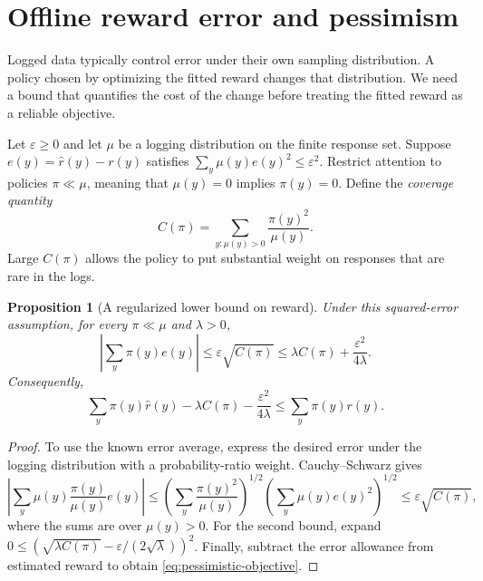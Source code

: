 \documentclass[11pt,twoside]{article}
\newtheorem{proposition}[theorem]{Proposition}
\theoremstyle{definition}
\theoremstyle{remark}
\begin{document}
\section{Offline reward error and pessimism}
\label{app:pessimism}

Logged data typically control error under their own sampling distribution.
A policy chosen by optimizing the fitted reward changes that distribution.
We need a bound that quantifies the cost of the change before treating the
fitted reward as a reliable objective.

Let $\varepsilon\ge0$ and let $\mu$ be a logging distribution on the finite
response set. Suppose
$e(y)=\widehat r(y)-r(y)$ satisfies
$\sum_y\mu(y)e(y)^2\le\varepsilon^2$.
Restrict attention to policies $\pi\ll\mu$, meaning that
$\mu(y)=0$ implies $\pi(y)=0$. Define the \emph{coverage quantity}
\[
 C(\pi)=\sum_{y:\mu(y)>0}\frac{\pi(y)^2}{\mu(y)}.
\]
Large $C(\pi)$ allows the policy to put substantial weight on responses
that are rare in the logs.

\begin{proposition}[A regularized lower bound on reward]
\label{prop:pessimism}
Under this squared-error assumption, for every $\pi\ll\mu$ and $\lambda>0$,
\begin{equation}
 \left|\sum_y\pi(y)e(y)\right|
 \le\varepsilon\sqrt{C(\pi)}
 \le\lambda C(\pi)+\frac{\varepsilon^2}{4\lambda}.
 \label{eq:offline-error}
\end{equation}
Consequently,
\begin{equation}
 \sum_y\pi(y)\widehat r(y)-\lambda C(\pi)
       -\frac{\varepsilon^2}{4\lambda}
 \le\sum_y\pi(y)r(y).
 \label{eq:pessimistic-objective}
\end{equation}
\end{proposition}
\begin{proof}
To use the known error average, express the desired error under the logging
distribution with a probability-ratio weight. Cauchy--Schwarz gives
\[
 \left|\sum_y\mu(y)\frac{\pi(y)}{\mu(y)}e(y)\right|
 \le\left(\sum_y\frac{\pi(y)^2}{\mu(y)}\right)^{1/2}
       \left(\sum_y\mu(y)e(y)^2\right)^{1/2}
 \le\varepsilon\sqrt{C(\pi)},
\]
where the sums are over $\mu(y)>0$.
For the second bound, expand
$0\le(\sqrt{\lambda C(\pi)}-\varepsilon/(2\sqrt\lambda))^2$.
Finally, subtract the error allowance from estimated reward to obtain
\cref{eq:pessimistic-objective}.
\end{proof}
\end{document}

